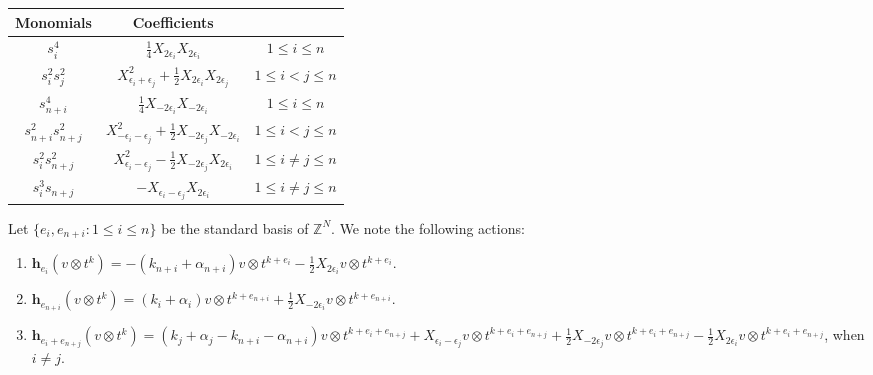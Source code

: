 \documentclass[a4paper,11pt]{amsart}
\numberwithin{equation}{section}
\theoremstyle{plain}
\newcommand{\Z}{\mathbb{Z}}
\renewcommand{\H}{\mathbf{h}}
\begin{document}
    \newpage
\begin{table}[htbp]
    \centering
    \begin{tabular}{|c|c|c|}
        \hline
        \textbf{Monomials} & \textbf{Coefficients} & \textbf{}  \\
        \hline
         $s_i^4$ &   $\frac{1}{4}X_{2\epsilon_i}X_{2\epsilon_i}$ &  $1\leq i\leq n$\\
         
        $s_i^2s_j^2$ & $X_{\epsilon_i+\epsilon_j}^2+\frac{1}{2}X_{2\epsilon_i}X_{2\epsilon_j}$ &  $1\leq i<j\leq n$\\
        
    $s_{n+i}^4$ &  $\frac{1}{4}X_{-2\epsilon_i}X_{-2\epsilon_i}$ & $1\leq i\leq n$ \\

      $s_{n+i}^2s_{n+j}^2$ & $X_{-\epsilon_i-\epsilon_j}^2+\frac{1}{2}X_{-2\epsilon_j}X_{-2\epsilon_i}$ & $1\leq i<j\leq n$ \\

      $s_i^2s_{n+j}^2$ & $X_{\epsilon_i-\epsilon_j}^2-\frac{1}{2}X_{-2\epsilon_j}X_{2\epsilon_i}$ & $1\leq i\neq j\leq n$ \\

      $s_i^3s_{n+j}$ & $-X_{\epsilon_i-\epsilon_j}X_{2\epsilon_i}$ &  $1\leq i\neq j\leq n$ \\    
      \hline
    \end{tabular}
\end{table}
 
    Let $\{e_i,e_{n+i}:1\leq i\leq n\}$ be the standard basis of $\Z^N$. We note the following actions: 
  
 \begin{enumerate}
     \item $\H_{e_i}(v\otimes t^k)=-(k_{n+i}+\alpha_{n+i})v\otimes t^{k+e_i}-\frac{1}{2}X_{2\epsilon_i}v\otimes t^{k+e_i}$.
     \item $\H_{e_{n+i}}(v\otimes t^k)=(k_{i}+\alpha_{i})v\otimes t^{k+e_{n+i}}+\frac{1}{2}X_{-2\epsilon_i}v\otimes t^{k+e_{n+i}}$.  
     \item $\H_{e_i+e_{n+j}}(v\otimes t^{k})=(k_j+\alpha_j-k_{n+i}-\alpha_{n+i})v\otimes t^{k+e_i+e_{n+j}}+X_{\epsilon_i-\epsilon_j}v\otimes t^{k+e_i+e_{n+j}}+\frac{1}{2}X_{-2\epsilon_j}v\otimes t^{k+e_i+e_{n+j}}-\frac{1}{2}X_{2\epsilon_i}v\otimes t^{k+e_i+e_{n+j}}$, when $i\neq j$.
 \end{enumerate}
 
  
\end{document}
